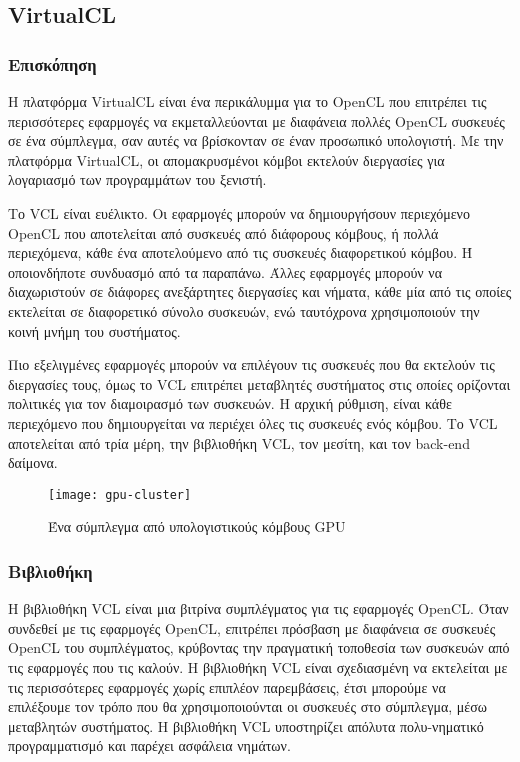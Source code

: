 \subsection{VirtualCL}
\subsubsection{Επισκόπηση}
Η πλατφόρμα VirtualCL είναι ένα περικάλυμμα για το OpenCL που επιτρέπει τις περισσότερες εφαρμογές να εκμεταλλεύονται με διαφάνεια πολλές OpenCL συσκευές σε ένα σύμπλεγμα, σαν αυτές να βρίσκονταν σε έναν προσωπικό υπολογιστή. Με την πλατφόρμα VirtualCL, οι απομακρυσμένοι κόμβοι εκτελούν διεργασίες για λογαριασμό των προγραμμάτων του ξενιστή.\cite{virtualcl-6}

Το VCL είναι ευέλικτο. Οι εφαρμογές μπορούν να δημιουργήσουν περιεχόμενο OpenCL που αποτελείται από συσκευές από διάφορους κόμβους, ή πολλά περιεχόμενα, κάθε ένα αποτελούμενο από τις συσκευές διαφορετικού κόμβου. Ή οποιονδήποτε συνδυασμό από τα παραπάνω. Άλλες εφαρμογές μπορούν να διαχωριστούν σε διάφορες ανεξάρτητες διεργασίες και νήματα, κάθε μία από τις οποίες εκτελείται σε διαφορετικό σύνολο συσκευών, ενώ ταυτόχρονα χρησιμοποιούν την κοινή μνήμη του συστήματος. 

Πιο εξελιγμένες εφαρμογές μπορούν να επιλέγουν τις συσκευές που θα εκτελούν τις διεργασίες τους, όμως το VCL επιτρέπει μεταβλητές συστήματος στις οποίες ορίζονται πολιτικές για τον διαμοιρασμό των συσκευών. Η αρχική ρύθμιση, είναι κάθε περιεχόμενο που δημιουργείται να περιέχει όλες τις συσκευές ενός κόμβου. Το VCL αποτελείται από τρία μέρη, την βιβλιοθήκη VCL, τον μεσίτη, και τον back-end δαίμονα. \cite{virtualcl-1}

\begin{figure}[h]
	\texttt{[image: gpu-cluster]}
	\centering
	\caption{Ένα σύμπλεγμα από υπολογιστικούς κόμβους GPU\cite{figure-2}}
\end{figure}

\subsubsection{Βιβλιοθήκη}
Η βιβλιοθήκη VCL είναι μια βιτρίνα συμπλέγματος για τις εφαρμογές OpenCL. Όταν συνδεθεί με τις εφαρμογές OpenCL, επιτρέπει πρόσβαση με διαφάνεια σε συσκευές OpenCL του συμπλέγματος, κρύβοντας την πραγματική τοποθεσία των συσκευών από τις εφαρμογές που τις καλούν. Η βιβλιοθήκη VCL είναι σχεδιασμένη να εκτελείται με τις περισσότερες εφαρμογές χωρίς επιπλέον παρεμβάσεις, έτσι μπορούμε να επιλέξουμε τον τρόπο που θα χρησιμοποιούνται οι συσκευές στο σύμπλεγμα, μέσω μεταβλητών συστήματος. Η βιβλιοθήκη VCL υποστηρίζει απόλυτα πολυ-νηματικό προγραμματισμό και παρέχει ασφάλεια νημάτων.\cite{virtualcl-2}

